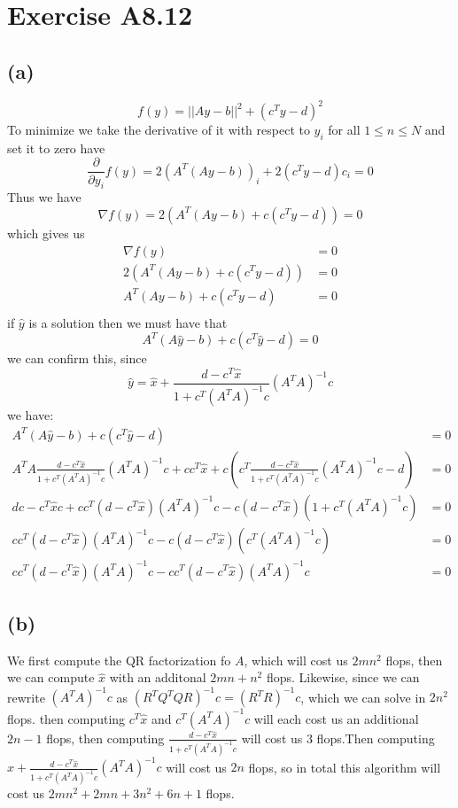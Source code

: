\section*{Exercise A8.12}
\subsection*{(a)}
$$f(y)=||Ay-b||^2+(c^Ty-d)^2$$
To minimize we take the derivative of it with respect to $y_i$ for all
$1\leq n \leq N$ and set it to zero have
$$\frac{\partial}{\partial y_i} f(y)=2(A^T(Ay-b))_i+2(c^Ty-d)c_i=0$$
Thus we have 
$$\nabla f(y)=2(A^T(Ay-b)+c(c^Ty-d))=0$$
which gives us
\begin{align*}
    \nabla f(y)&=0\\
    2(A^T(Ay-b)+c(c^Ty-d))&=0\\
    A^T(Ay-b)+c(c^Ty-d)&=0\\
\end{align*}
if $\hat{y}$ is a solution then we must have that
$$A^T(A\hat{y}-b)+c(c^T\hat{y}-d)=0$$
we can confirm this, since 
$$\hat{y}=\hat{x}+\frac{d-c^T\hat{x}}{1+c^T(A^TA)^{-1}c}(A^TA)^{-1}c$$
we have:
\begin{align*}
    A^T(A\hat{y}-b)+c(c^T\hat{y}-d)&=0\\
    A^TA\frac{d-c^T\hat{x}}{1+c^T(A^TA)^{-1}c}(A^TA)^{-1}c+cc^T\hat{x}+c(c^T\frac{d-c^T\hat{x}}{1+c^T(A^TA)^{-1}c}(A^TA)^{-1}c-d)&=0\\
    dc-c^T\hat{x}c+cc^T(d-c^T\hat{x})(A^TA)^{-1}c-c(d-c^T\hat{x})(1+c^T(A^TA)^{-1}c)&=0\\
    cc^T(d-c^T\hat{x})(A^TA)^{-1}c-c(d-c^T\hat{x})(c^T(A^TA)^{-1}c)&=0\\
    cc^T(d-c^T\hat{x})(A^TA)^{-1}c-cc^T(d-c^T\hat{x})(A^TA)^{-1}c&=0
\end{align*}
\subsection*{(b)}
We first compute the QR factorization fo $A$, which will cost us $2mn^2$ flops, 
then we can compute 
$\hat{x}$ with an additonal $2mn+n^2$ flops. Likewise,
since we can rewrite $(A^TA)^{-1}c$ as $(R^TQ^TQR)^{-1}c=(R^TR)^{-1}c$, which 
we can solve in $2n^2$ flops. then computing $c^T\hat{x}$ and $c^T(A^TA)^{-1}c$ will
each cost us an additional $2n-1$ flops, then computing $\frac{d-c^T\hat{x}}{1+c^T(A^TA)^{-1}c}$ will 
cost us 3 flops.Then computing $\hat{x}+\frac{d-c^T\hat{x}}{1+c^T(A^TA)^{-1}c}(A^TA)^{-1}c$
will cost us $2n$ flops, so in total this algorithm will cost us 
$\boxed{2mn^2+2mn+3n^2+6n+1}$ flops.





